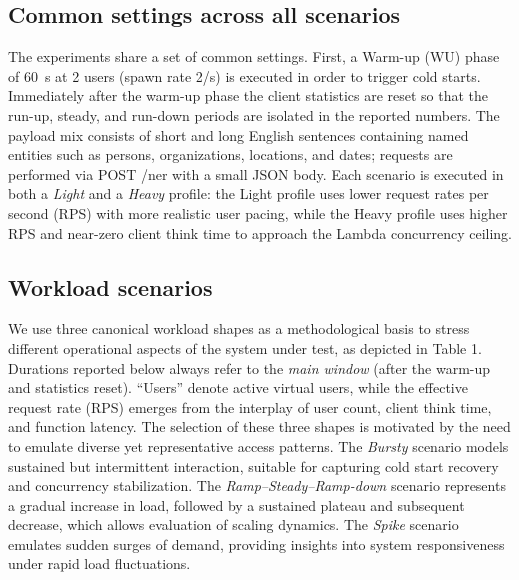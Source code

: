 \documentclass[11pt,a4paper]{article}
\begin{document}
\subsection{Common settings across all scenarios}
The experiments share a set of common settings. First, a Warm-up (WU) phase of \SI{60}{s} at 2 users (spawn rate 2/s) is executed in order to trigger cold starts. Immediately after the warm-up phase the client statistics are reset so that the run-up, steady, and run-down periods are isolated in the reported numbers. The payload mix consists of short and long English sentences containing named entities such as persons, organizations, locations, and dates; requests are performed via POST /ner with a small JSON body. Each scenario is executed in both a \emph{Light} and a \emph{Heavy} profile: the Light profile uses lower request rates per second (RPS) with more realistic user pacing, while the Heavy profile uses higher RPS and near-zero client think time to approach the Lambda concurrency ceiling.

\subsection{Workload scenarios}
We use three canonical workload shapes as a methodological basis to stress different operational aspects of the system under test, as depicted in Table 1. Durations reported below always refer to the \emph{main window} (after the warm-up and statistics reset). ``Users'' denote active virtual users, while the effective request rate (RPS) emerges from the interplay of user count, client think time, and function latency. The selection of these three shapes is motivated by the need to emulate diverse yet representative access patterns. The \emph{Bursty} scenario models sustained but intermittent interaction, suitable for capturing cold start recovery and concurrency stabilization. The \emph{Ramp--Steady--Ramp-down} scenario represents a gradual increase in load, followed by a sustained plateau and subsequent decrease, which allows evaluation of scaling dynamics. The \emph{Spike} scenario emulates sudden surges of demand, providing insights into system responsiveness under rapid load fluctuations.
\end{document}
